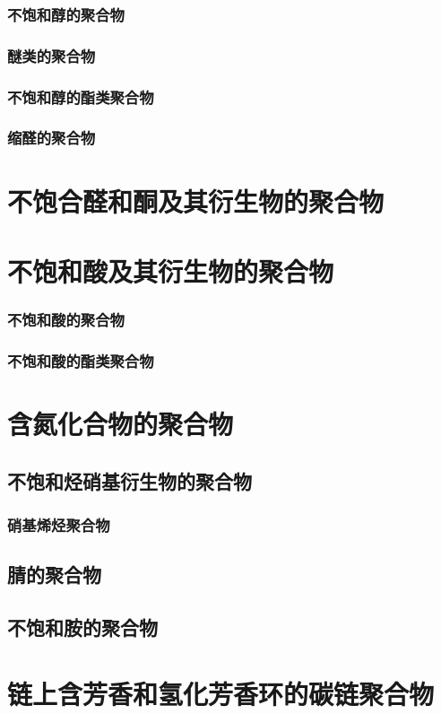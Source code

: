 \documentclass[UTF8]{../03-Chemistry}
\begin{document}
    \subsubsection{不饱和醇的聚合物}
    \subsubsection{醚类的聚合物}
    \subsubsection{不饱和醇的酯类聚合物}
    \subsubsection{缩醛的聚合物}
\section{不饱合醛和酮及其衍生物的聚合物}
\section{不饱和酸及其衍生物的聚合物}
    \subsubsection{不饱和酸的聚合物}
    \subsubsection{不饱和酸的酯类聚合物}
\section{含氮化合物的聚合物}
    \subsection{不饱和烃硝基衍生物的聚合物}
        \subsubsection{硝基烯烃聚合物}
    \subsection{腈的聚合物}
    \subsection{不饱和胺的聚合物}
\section{链上含芳香和氢化芳香环的碳链聚合物}
\end{document}
